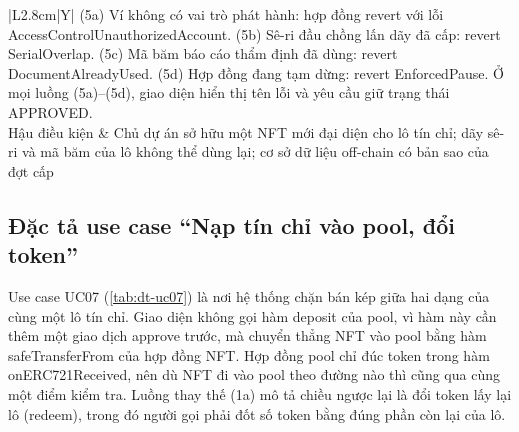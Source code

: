 \begin{table}[!htbp]
\begin{tabularx}{\textwidth}{|L{2.8cm}|Y|}
        (5a) Ví không có vai trò phát hành: hợp đồng revert với lỗi AccessControlUnauthorizedAccount.\newline
        (5b) Sê-ri đầu chồng lấn dãy đã cấp: revert SerialOverlap.\newline
        (5c) Mã băm báo cáo thẩm định đã dùng: revert DocumentAlreadyUsed.\newline
        (5d) Hợp đồng đang tạm dừng: revert EnforcedPause.\newline
        Ở mọi luồng (5a)–(5d), giao diện hiển thị tên lỗi và yêu cầu giữ trạng thái APPROVED. \\
        \hline
        Hậu điều kiện & Chủ dự án sở hữu một NFT mới đại diện cho lô tín chỉ; dãy sê-ri và mã băm của lô không thể dùng lại; cơ sở dữ liệu off-chain có bản sao của đợt cấp \\
        \hline
    \end{tabularx}
\end{table}

\subsection*{Đặc tả use case ``Nạp tín chỉ vào pool, đổi token''}
\label{subsec:dt-uc07}

Use case UC07 (\autoref{tab:dt-uc07}) là nơi hệ thống chặn bán kép giữa hai dạng của cùng một lô tín chỉ. Giao diện không gọi hàm deposit của pool, vì hàm này cần thêm một giao dịch approve trước, mà chuyển thẳng NFT vào pool bằng hàm safeTransferFrom của hợp đồng NFT. Hợp đồng pool chỉ đúc token trong hàm onERC721Received, nên dù NFT đi vào pool theo đường nào thì cũng qua cùng một điểm kiểm tra. Luồng thay thế (1a) mô tả chiều ngược lại là đổi token lấy lại lô (redeem), trong đó người gọi phải đốt số token bằng đúng phần còn lại của lô.

